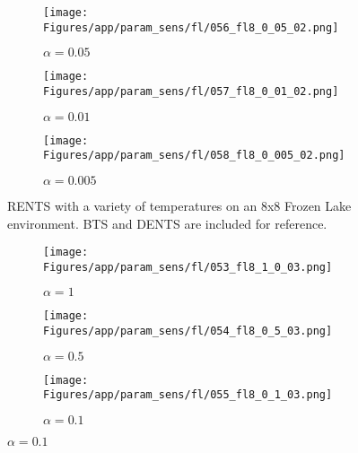 \documentclass{article}
\theoremstyle{plain}
\begin{document}
\begin{appendices}
\begin{figure}
                \begin{subfigure}[b]{0.32\textwidth}
                    \centering
                    \texttt{[image: Figures/app/param\_sens/fl/056\_fl8\_0\_05\_02.png]}
                    \caption{$\alpha=0.05$}
                \end{subfigure}
                \begin{subfigure}[b]{0.32\textwidth}
                    \centering
                    \texttt{[image: Figures/app/param\_sens/fl/057\_fl8\_0\_01\_02.png]}
                    \caption{$\alpha=0.01$}
                \end{subfigure}
                \begin{subfigure}[b]{0.32\textwidth}
                    \centering
                    \texttt{[image: Figures/app/param\_sens/fl/058\_fl8\_0\_005\_02.png]}
                    \caption{$\alpha=0.005$}
                \end{subfigure}
                
                \caption{RENTS with a variety of temperatures on an 8x8 Frozen Lake environment. BTS and DENTS are included for reference.}
                \label{fig:fl_param_sens_rents}
            \end{figure}
            
            \begin{figure}
                \centering
                
                \begin{subfigure}[b]{0.32\textwidth}
                    \centering
                    \texttt{[image: Figures/app/param\_sens/fl/053\_fl8\_1\_0\_03.png]}
                    \caption{$\alpha=1$}
                \end{subfigure}
                \begin{subfigure}[b]{0.32\textwidth}
                    \centering
                    \texttt{[image: Figures/app/param\_sens/fl/054\_fl8\_0\_5\_03.png]}
                    \caption{$\alpha=0.5$}
                \end{subfigure}
                \begin{subfigure}[b]{0.32\textwidth}
                    \centering
                    \texttt{[image: Figures/app/param\_sens/fl/055\_fl8\_0\_1\_03.png]}
                    \caption{$\alpha=0.1$}
                \end{subfigure}
                

\end{figure}
\end{appendices}
\end{document}
